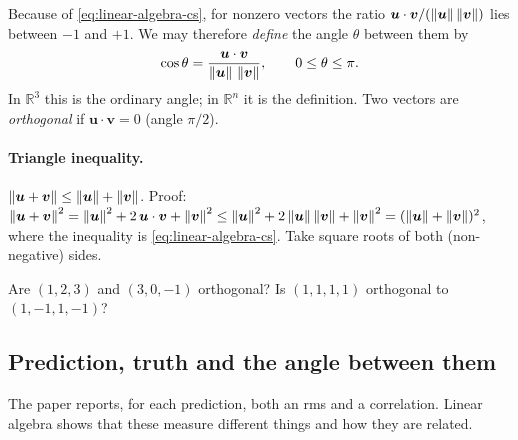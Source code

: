 Because of \cref{eq:linear-algebra-cs}, for nonzero vectors the ratio $\bm u\cdot\bm v/(\left\lVert \bm u\right\rVert\left\lVert \bm v\right\rVert)$ lies between $-1$ and $+1$. We may therefore \emph{define} the angle $\theta$ between them by
\begin{equation}
\cos\theta=\frac{\bm u\cdot\bm v}{\left\lVert \bm u\right\rVert\,\left\lVert \bm v\right\rVert},\qquad 0\le\theta\le\pi .
\label{eq:linear-algebra-angle}
\end{equation}
In $\mathbb R^3$ this is the ordinary angle; in $\mathbb R^n$ it is the definition. Two vectors are \emph{orthogonal} if $\bm u\cdot\bm v=0$ (angle $\pi/2$).

\paragraph{Triangle inequality.} $\left\lVert \bm u+\bm v\right\rVert\le\left\lVert \bm u\right\rVert+\left\lVert \bm v\right\rVert$. Proof: $\left\lVert \bm u+\bm v\right\rVert^2=\left\lVert \bm u\right\rVert^2+2\,\bm u\cdot\bm v+\left\lVert \bm v\right\rVert^2\le\left\lVert \bm u\right\rVert^2+2\left\lVert \bm u\right\rVert\left\lVert \bm v\right\rVert+\left\lVert \bm v\right\rVert^2=(\left\lVert \bm u\right\rVert+\left\lVert \bm v\right\rVert)^2$, where the inequality is \cref{eq:linear-algebra-cs}. Take square roots of both (non-negative) sides.

\begin{checkpoint}
Are $(1,2,3)$ and $(3,0,-1)$ orthogonal? Is $(1,1,1,1)$ orthogonal to $(1,-1,1,-1)$?
\end{checkpoint}

\subsection{Prediction, truth and the angle between them}

The paper reports, for each prediction, both an rms and a correlation. Linear algebra shows that these measure different things and how they are related.


